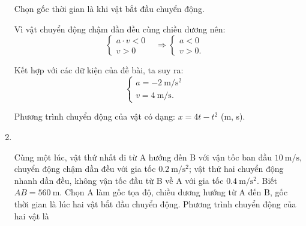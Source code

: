 \begin{enumerate}[label=\bfseries Câu \arabic*:]
{		Chọn gốc thời gian là khi vật bắt đầu chuyển động.
		
		Vì vật chuyển động chậm dần đều cùng chiều dương nên:
		\begin{equation*}
			\left\{\begin{array}{ll}{a\cdot v <0}&\\{v > 0}&\end{array}\right.\Rightarrow \left\{\begin{array}{ll}{a < 0}&\\{v > 0.}&\end{array}\right.
		\end{equation*}
		
		Kết hợp với các dữ kiện của đề bài, ta suy ra:
		\begin{equation*}
			\left\{\begin{array}{ll}{a=\SI{-2}{\meter/\second^2}}&\\{v=\SI{4}{\meter/\second} .}&\end{array}\right.
		\end{equation*}
		
		Phương trình chuyển động của vật có dạng:
		$x=4t-t^2$ (m, s).
	}


	\item 	{}\\
	{Cùng một lúc, vật thứ nhất đi từ A hướng đến B với vận tốc ban đầu $\SI{10}{\meter/\second}$, chuyển động chậm dần đều với gia tốc $\SI{0.2}{\meter/\second^2}$; vật thứ hai chuyển động nhanh dần đều, không vận tốc đầu từ B về A với gia tốc $\SI{0.4}{\meter/\second^2}$. Biết $AB = \SI{560}{\meter}$. Chọn A làm gốc tọa độ, chiều dương hướng từ A đến B, gốc thời gian là lúc hai vật bắt đầu chuyển động. Phương trình chuyển động của hai vật là
	
}


\end{enumerate}
